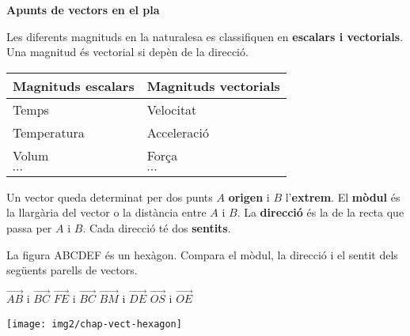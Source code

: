 \documentclass[11pt, a4paper, pdf]{article}
\begin{document}
\pagestyle{blocfancy}
\setcounter{myenumi}{0}
 
 \begin{center}
 {\Large  \textbf{Apunts de vectors en el pla}}
 \end{center}
 \begin{blueshaded}
 	Les diferents magnituds en la naturalesa es classifiquen en \textbf{escalars i vectorials}. Una magnitud és vectorial si depèn de la direcció.
 	\begin{center}
 		\begin{tabular}{p{} | p{}}
 			\textbf{Magnituds escalars} & \textbf{Magnituds vectorials} \\ \hline
 			Temps       & Velocitat \\
 			Temperatura & Acceleració \\
 			Volum       & Força \\
 			$\cdots$   & $\cdots$ 
 		\end{tabular}
 	\end{center}
 	
 	Un vector queda determinat per dos punts $A$ \textbf{origen} i $B$ l'\textbf{extrem}. El \textbf{mòdul} és la llargària del vector o la distància entre $A$ i $B$. La \textbf{direcció} és la de la recta que passa per $A$ i $B$. Cada direcció té dos \textbf{sentits}.
 \end{blueshaded}
 

\begin{mylist}
	
	\item 
	
	La figura ABCDEF és un hexàgon. Compara el mòdul, la direcció i el sentit dels següents parells de vectors.
	
	\begin{minipage}{0.6\textwidth}
		\begin{tasks} 
			\task $\overrightarrow{AB}$ i	$\overrightarrow{BC}$
			\task $\overrightarrow{FE}$ i	$\overrightarrow{BC}$
			\task $\overrightarrow{BM}$ i	$\overrightarrow{DE}$
			\task $\overrightarrow{OS}$ i	$\overrightarrow{OE}$
		\end{tasks}
	\end{minipage}
	\begin{minipage}{0.34\textwidth} 
		\begin{center}
			\vspace{-0.25cm}
			\texttt{[image: img2/chap-vect-hexagon]}
		\end{center}
	\end{minipage}
	
	
\end{mylist}
\end{document}
